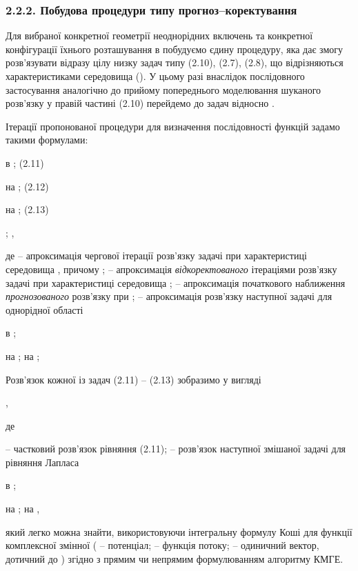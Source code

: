 \hypertarget{ux43fux43eux431ux443ux434ux43eux432ux430-ux43fux440ux43eux446ux435ux434ux443ux440ux438-ux442ux438ux43fux443-ux43fux440ux43eux433ux43dux43eux437ux43aux43eux440ux435ux43aux442ux443ux432ux430ux43dux43dux44f}{%
\subsubsection{2.2.2. Побудова процедури типу
прогноз--коректування}\label{ux43fux43eux431ux443ux434ux43eux432ux430-ux43fux440ux43eux446ux435ux434ux443ux440ux438-ux442ux438ux43fux443-ux43fux440ux43eux433ux43dux43eux437ux43aux43eux440ux435ux43aux442ux443ux432ux430ux43dux43dux44f}}

Для вибраної конкретної геометрії неоднорідних включень та конкретної
конфігурації їхнього розташування в побудуємо єдину процедуру, яка дає
змогу розв'язувати відразу цілу низку задач типу (2.10), (2.7), (2.8),
що відрізняються характеристиками середовища (). У цьому разі внаслідок
послідовного застосування аналогічно до прийому попереднього моделювання
шуканого розв'язку у правій частині (2.10) перейдемо до задач відносно .

Ітерації пропонованої процедури для визначення послідовності функцій
задамо такими формулами:

в ; (2.11)

на ; (2.12)

на ; (2.13)

; ,

де -- апроксимація чергової ітерації розв'язку задачі при характеристиці
середовища , причому ; -- апроксимація \emph{відкоректованого}
ітераціями розв'язку задачі при характеристиці середовища ; --
апроксимація початкового наближення \emph{прогнозованого} розв'язку при
; -- апроксимація розв'язку наступної задачі для однорідної області

в ;

на ; на ;

Розв'язок кожної із задач (2.11) -- (2.13) зобразимо у вигляді

,

де

-- частковий розв'язок рівняння (2.11); -- розв'язок наступної змішаної
задачі для рівняння Лапласа

в ;

на ; на ,

який легко можна знайти, використовуючи інтегральну формулу Коші для
функції комплексної змінної ( -- потенціал; -- функція потоку; --
одиничний вектор, дотичний до ) згідно з прямим чи непрямим
формулюванням алгоритму КМГЕ.

